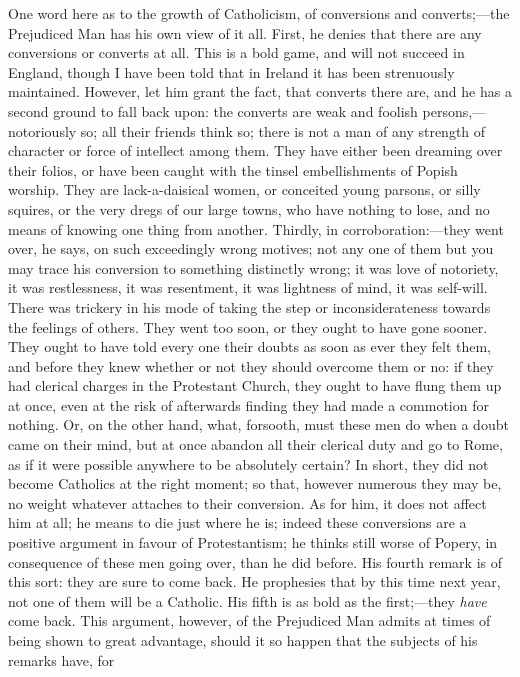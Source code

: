 One word here as to the growth of Catholicism, of
conversions and converts;—the Prejudiced Man has his
own view of it all. First, he denies that there are any
conversions or converts at all. This is a bold game, and
will not succeed in England, though I have been told that
in Ireland it has been strenuously maintained. However,
let him grant the fact, that converts there are, and he
has a second ground to fall back upon: the converts are
weak and foolish persons,—notoriously so; all their
friends think so; there is not a man of any strength of
character or force of intellect among them. They have
either been dreaming over their folios, or have been
caught with the tinsel embellishments of Popish worship.
They are lack-a-daisical women, or conceited young
parsons, or silly squires, or the very dregs of our large
towns, who have nothing to lose, and no means of knowing
one thing from another. Thirdly, in
corroboration:—they went over, he says, on such
exceedingly wrong motives; not any one of them but you
may trace his conversion to something distinctly wrong;
it was love of notoriety, it was restlessness, it was
resentment, it was lightness of mind, it was self-will.
There was trickery in his mode of taking the step or
inconsiderateness towards the feelings of others. They
went too soon, or they ought to have gone sooner. They
ought to have told every one their doubts as soon as ever
they felt them, and before they knew whether or not they
should overcome them or no: if they had clerical charges
in the Protestant Church, they ought to have flung them
up at once, even at the risk of afterwards finding they
had made a commotion for nothing. Or, on the other hand,
what, forsooth, must these men do when a doubt came on
their mind, but at once abandon all their clerical duty
and go to Rome, as if it were possible anywhere to be
absolutely certain? In short, they did not become
Catholics at the right moment; so that, however numerous
they may be, no weight whatever attaches to their
conversion. As for him, it does not affect him at all; he
means to die just where he is; indeed these conversions
are a positive argument in favour of Protestantism; he
thinks still worse of Popery, in consequence of these men
going over, than he did before. His fourth remark is of
this sort: they are sure to come back. He prophesies that
by this time next year, not one of them will be a
Catholic. His fifth is as bold as the first;—they \emph{have}
come back. This argument, however, of the Prejudiced Man
admits at times of being shown to great advantage, should
it so happen that the subjects of his remarks have, for
